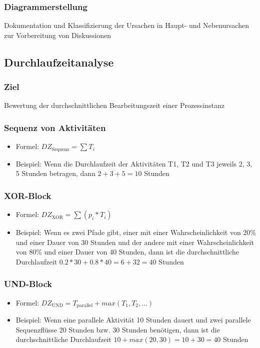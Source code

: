     \subsubsection*{Diagrammerstellung}
        Dokumentation und Klassifizierung der Ursachen in Haupt- und Nebenursachen zur Vorbereitung von Diskussionen

\subsection{Durchlaufzeitanalyse}
    \subsubsection*{Ziel}
        Bewertung der durchschnittlichen Bearbeitungszeit einer Prozessinstanz
    \subsubsection*{Sequenz von Aktivitäten}
        \begin{itemize}
            \item Formel: $DZ_{\text{Sequenz}} = \sum T_i$
            \item Beispiel: Wenn die Durchlaufzeit der Aktivitäten T1, T2 und T3 jeweils 2, 3, 5 Stunden betragen, dann $2+3+5=10$ Stunden
        \end{itemize}
    \subsubsection*{XOR-Block}
        \begin{itemize}
            \item Formel: $DZ_{\text{XOR}} = \sum (p_i * T_i)$
            \item Beispiel: Wenn es zwei Pfade gibt, einer mit einer Wahrscheinlichkeit von 20\% und einer Dauer von 30 Stunden und der andere mit einer Wahrscheinlichkeit von 80\% und einer Dauer von 40 Stunden, dann ist die durchschnittliche Durchlaufzeit $0.2*30+0.8*40=6+32=40$ Stunden
        \end{itemize}
    \subsubsection*{UND-Block}
        \begin{itemize}
            \item Formel: $DZ_{\text{UND}} = T_{\text{parallel}} + max(T_1, T_2, ...)$
            \item Beispiel: Wenn eine parallele Aktivität 10 Stunden dauert und zwei parallele Sequenzflüsse 20 Stunden bzw. 30 Stunden benötigen, dann ist die durchschnittliche Durchlaufzeit $10+max(20, 30)=10+30=40$ Stunden
        \end{itemize}
